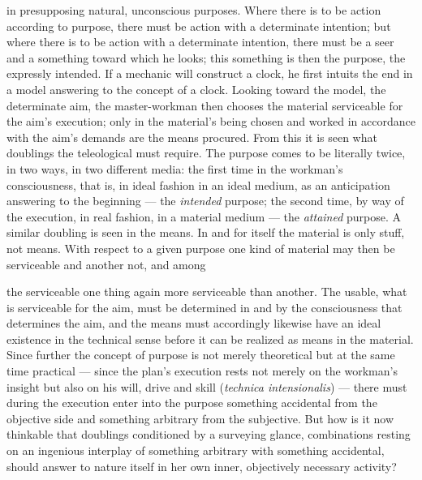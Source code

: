 \documentclass[12pt,a4paper]{book}
\begin{document}
in presupposing natural, unconscious purposes. Where there is to be action
according to purpose, there must be action with a determinate intention; but
where there is to be action with a determinate intention, there must be a seer
and a something toward which he looks; this something is then the purpose, the
expressly intended. If a mechanic will construct a clock, he first intuits the
end in a model answering to the concept of a clock. Looking toward the model,
the determinate aim, the master-workman then chooses the material serviceable
for the aim's execution; only in the material's being chosen and worked in
accordance with the aim's demands are the means procured. From this it is seen
what doublings the teleological must require. The purpose comes to be literally
twice, in two ways, in two different media: the first time in the workman's
consciousness, that is, in ideal fashion in an ideal medium, as an anticipation
answering to the beginning --- the \emph{intended} purpose; the second time, by
way of the execution, in real fashion, in a material medium --- the
\emph{attained} purpose. A similar doubling is seen in the means. In and for
itself the material is only stuff, not means. With respect to a given purpose one
kind of material may then be serviceable and another not, and among

the serviceable one thing again more serviceable than another. The usable, what
is serviceable for the aim, must be determined in and by the consciousness that
determines the aim, and the means must accordingly likewise have an ideal
existence in the technical sense before it can be realized as means in the
material. Since further the concept of purpose is not merely theoretical but at
the same time practical --- since the plan's execution rests not merely on the
workman's insight but also on his will, drive and skill
(\textit{technica intensionalis}) --- there must during the execution enter into
the purpose something accidental from the objective side and something arbitrary
from the subjective. But how is it now thinkable that doublings conditioned by a
surveying glance, combinations resting on an ingenious interplay of something
arbitrary with something accidental, should answer to nature itself in her own
inner, objectively necessary activity?
\end{document}
